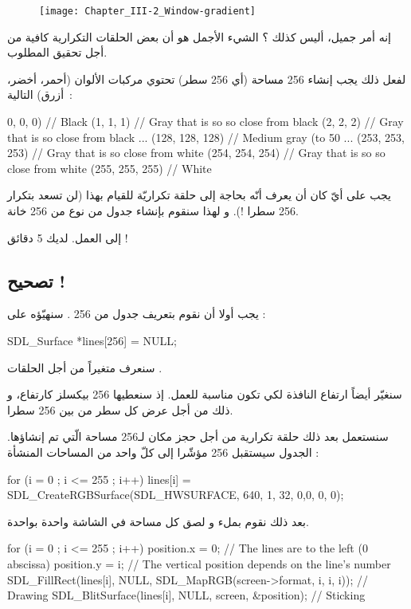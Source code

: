 \begin{figure}[H]
	\centering
	\texttt{[image: Chapter\_III-2\_Window-gradient]}
\end{figure}

 إنه أمر جميل، أليس كذلك ؟ الشيء الأجمل هو أن بعض الحلقات التكرارية كافية من أجل تحقيق المطلوب.
 
لفعل ذلك يجب إنشاء 256 مساحة (أي 256 سطر) تحتوي مركبات الألوان (أحمر، أخضر، أزرق) التالية~:

\begin{Csource}
0, 0, 0) // Black
(1, 1, 1) // Gray that is so so close from black
(2, 2, 2) // Gray that is so close from black
...
(128, 128, 128) // Medium gray (to 50 %
...
(253, 253, 253) // Gray that is so  close from white
(254, 254, 254) // Gray that is so so close from white
(255, 255, 255) // White
\end{Csource}

يجب على أيّ كان أن يعرف أنّه بحاجة إلى حلقة تكراريّة للقيام بهذا (لن تسعد بتكرار 256 سطرا !). و لهذا سنقوم بإنشاء جدول من نوع 
من 256 خانة.

إلى العمل. لديك 5 دقائق !

\subsection{تصحيح !}
 
يجب أولا أن نقوم بتعريف جدول من 256
.
سنهيّؤه على
 :

\begin{Csource}
SDL_Surface *lines[256] = {NULL};
\end{Csource}

سنعرف متغيراً
من أجل الحلقات 
.

سنغيّر أيضاً ارتفاع النافذة لكي تكون مناسبة للعمل. إذ سنعطيها 256 بيكسلز كارتفاع، و ذلك من أجل عرض كل سطر من بين 256 سطرا.

سنستعمل بعد ذلك حلقة تكرارية
من أجل حجز مكان لـ256 مساحة الّتي تم إنشاؤها. الجدول سيستقبل 256 مؤشّرا إلى كلّ واحد من المساحات المنشأة :

\begin{Csource}
for (i = 0 ; i <= 255 ; i++)
	lines[i] = SDL_CreateRGBSurface(SDL_HWSURFACE, 640, 1, 32, 0,0, 0, 0);
\end{Csource}

بعد ذلك نقوم بملء و لصق كل مساحة في الشاشة واحدة بواحدة.

\begin{Csource}
for (i = 0 ; i <= 255 ; i++)
{
	position.x = 0; // The lines are to the left (0 abscissa)
	position.y = i; // The vertical position depends on the line's number
	SDL_FillRect(lines[i], NULL, SDL_MapRGB(screen->format, i, i, i)); // Drawing
	SDL_BlitSurface(lines[i], NULL, screen, &position); // Sticking
}
\end{Csource}

